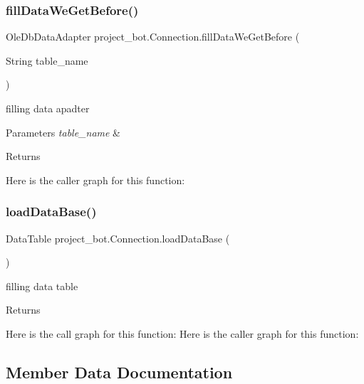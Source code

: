 \subsubsection{\texorpdfstring{fill\+Data\+We\+Get\+Before()}{fillDataWeGetBefore()}}
{\footnotesize\ttfamily Ole\+Db\+Data\+Adapter project\+\_\+bot.\+Connection.\+fill\+Data\+We\+Get\+Before (\begin{DoxyParamCaption}\item[{String}]{table\+\_\+name }\end{DoxyParamCaption})}



filling data apadter 


\begin{DoxyParams}{Parameters}
{\em table\+\_\+name} & \\
\hline
\end{DoxyParams}
\begin{DoxyReturn}{Returns}

\end{DoxyReturn}
Here is the caller graph for this function\+:
\mbox{\label{classproject__bot_1_1_connection_a03f99178a79b05fef2f3a429a0a04df4}} 
\subsubsection{\texorpdfstring{load\+Data\+Base()}{loadDataBase()}}
{\footnotesize\ttfamily Data\+Table project\+\_\+bot.\+Connection.\+load\+Data\+Base (\begin{DoxyParamCaption}{ }\end{DoxyParamCaption})}



filling data table 

\begin{DoxyReturn}{Returns}

\end{DoxyReturn}
Here is the call graph for this function\+:
Here is the caller graph for this function\+:


\subsection{Member Data Documentation}
\mbox{\label{classproject__bot_1_1_connection_a4cb9b8b0a35c7f47792fa864d3fcff24}} 
